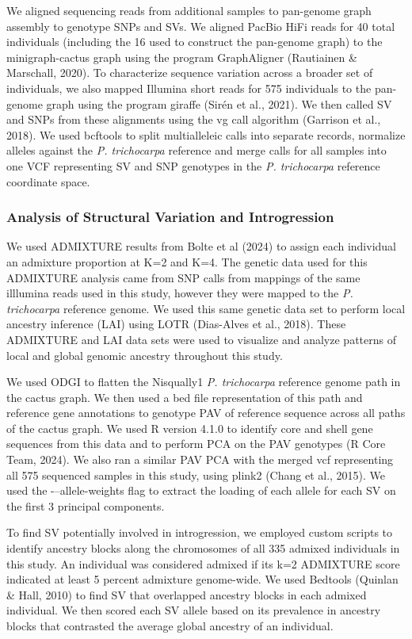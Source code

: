 \documentclass[
]{agujournal2019}
\begin{document}
We aligned sequencing reads from additional samples to pan-genome graph
assembly to genotype SNPs and SVs. We aligned PacBio HiFi reads for 40
total individuals (including the 16 used to construct the pan-genome
graph) to the minigraph-cactus graph using the program GraphAligner
(Rautiainen \& Marschall, 2020). To characterize sequence variation
across a broader set of individuals, we also mapped Illumina short reads
for 575 individuals to the pan-genome graph using the program giraffe
(Sirén et al., 2021). We then called SV and SNPs from these alignments
using the vg call algorithm (Garrison et al., 2018). We used bcftools to
split multialleleic calls into separate records, normalize alleles
against the \emph{P. trichocarpa} reference and merge calls for all
samples into one VCF representing SV and SNP genotypes in the \emph{P.
trichocarpa} reference coordinate space.

\subsubsection{Analysis of Structural Variation and
Introgression}\label{analysis-of-structural-variation-and-introgression}

We used ADMIXTURE results from Bolte et al (2024) to assign each
individual an admixture proportion at K=2 and K=4. The genetic data used
for this ADMIXTURE analysis came from SNP calls from mappings of the
same illlumina reads used in this study, however they were mapped to the
\emph{P. trichocarpa} reference genome. We used this same genetic data
set to perform local ancestry inference (LAI) using LOTR (Dias-Alves et
al., 2018). These ADMIXTURE and LAI data sets were used to visualize and
analyze patterns of local and global genomic ancestry throughout this
study.

We used ODGI to flatten the Nisqually1 \emph{P. trichocarpa} reference
genome path in the cactus graph. We then used a bed file representation
of this path and reference gene annotations to genotype PAV of reference
sequence across all paths of the cactus graph. We used R version 4.1.0
to identify core and shell gene sequences from this data and to perform
PCA on the PAV genotypes (R Core Team, 2024). We also ran a similar PAV
PCA with the merged vcf representing all 575 sequenced samples in this
study, using plink2 (Chang et al., 2015). We used the
-\/--allele-weights flag to extract the loading of each allele for each
SV on the first 3 principal components.

To find SV potentially involved in introgression, we employed custom
scripts to identify ancestry blocks along the chromosomes of all 335
admixed individuals in this study. An individual was considered admixed
if its k=2 ADMIXTURE score indicated at least 5 percent admixture
genome-wide. We used Bedtools (Quinlan \& Hall, 2010) to find SV that
overlapped ancestry blocks in each admixed individual. We then scored
each SV allele based on its prevalence in ancestry blocks that
contrasted the average global ancestry of an individual.
\end{document}
